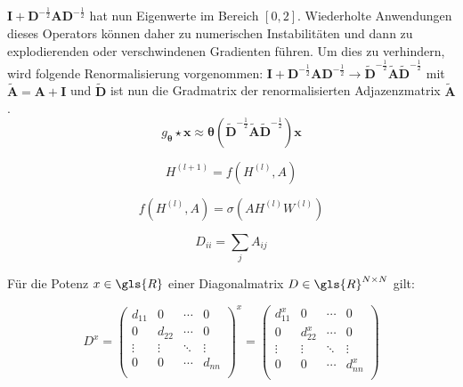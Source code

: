 $\mathbf{I} + \mathbf{D}^{-\frac{1}{2}} \mathbf{A} \mathbf{D}^{-\frac{1}{2}}$ hat nun Eigenwerte im Bereich $\left[0, 2\right]$.
Wiederholte Anwendungen dieses Operators können daher zu numerischen Instabilitäten und dann zu explodierenden oder verschwindenen Gradienten führen.
Um dies zu verhindern, wird folgende Renormalisierung vorgenommen:
$\mathbf{I} + \mathbf{D}^{-\frac{1}{2}} \mathbf{A} \mathbf{D}^{-\frac{1}{2}} \to \mathbf{\tilde D}^{-\frac{1}{2}} \mathbf{\tilde A} \mathbf{\tilde D}^{-\frac{1}{2}}$ mit $\mathbf{\tilde A} = \mathbf{A} + \mathbf{I}$ und $\mathbf{\tilde D}$ ist nun die Gradmatrix der renormalisierten Adjazenzmatrix $\mathbf{\tilde A}$.
\begin{equation}
  g_{\mathbf{\theta}} \star \mathbf{x} \approx \mathbf{\theta} \left(\mathbf{\tilde D}^{-\frac{1}{2}} \mathbf{\tilde A} \mathbf{\tilde D}^{-\frac{1}{2}}\right) \mathbf{x}
\end{equation}

\begin{equation}
  H^{(l+1)} = f(H^{(l)}, A)
\end{equation}

\begin{equation}
  f(H^{(l)}, A) = \sigma(AH^{(l)}W^{(l)})
\end{equation}

\begin{equation}
  D_{ii} = \sum_j A_{ij}
\end{equation}

Für die Potenz $x \in \gls{R}$ einer Diagonalmatrix $D \in \gls{R}^{N \times N}$ gilt:

\begin{equation}
  D^x = \begin{pmatrix}
    d_{11} & 0 & \cdots & 0\\
    0 & d_{22} & \cdots & 0\\
    \vdots & \vdots & \ddots & \vdots\\
    0 & 0 & \cdots & d_{nn}\\
  \end{pmatrix}^x = \begin{pmatrix}
    d_{11}^x & 0 & \cdots & 0\\
    0 & d_{22}^x & \cdots & 0\\
    \vdots & \vdots & \ddots & \vdots\\
    0 & 0 & \cdots & d_{nn}^x\\
  \end{pmatrix}
\end{equation}

